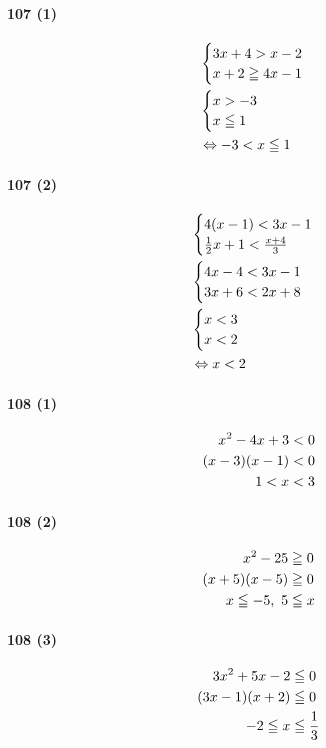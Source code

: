 \documentclass[fleqn,a4j,dvipdfmx,uplatex,twocolumn]{jsarticle}
\def\nr{\notag\\}%
\begin{document}
\paragraph{107 (1)}
\begin{align*}
  &\begin{cases} 3x+4 > x-2 \\ x+2 \geqq 4x-1 \end{cases} \nr
  &\begin{cases} x > -3 \\ x \leqq 1 \end{cases} \nr
  &\Leftrightarrow -3 < x \leqq 1
\end{align*}

\paragraph{107 (2)}
\begin{align*}
  &\begin{cases} 4(x-1) < 3x-1 \\ \frac{1}{2}x+1 < \frac{x+4}{3} \end{cases} \nr
  &\begin{cases} 4x-4 < 3x-1 \\ 3x+6 < 2x+8 \end{cases} \nr
  &\begin{cases} x < 3 \\ x < 2 \end{cases} \nr
  &\Leftrightarrow x < 2
\end{align*}

\paragraph{108 (1)}
\begin{align*}
  x^2-4x+3 &< 0 \nr
  (x-3)(x-1) &< 0 \nr
  1 < x &< 3
\end{align*}

\paragraph{108 (2)}
\begin{align*}
  x^2-25 &\geqq 0 \nr
  (x+5)(x-5) &\geqq 0 \nr
  x \leqq -5,\ 5 &\leqq x
\end{align*}

\paragraph{108 (3)}
\begin{align*}
  3x^2+5x-2 &\leqq 0 \nr
  (3x-1)(x+2) &\leqq 0 \nr
  -2 \leqq x &\leqq \frac{1}{3}
\end{align*}
\end{document}
